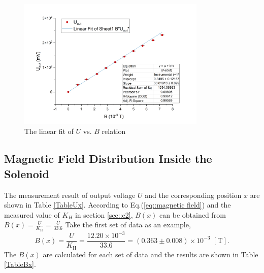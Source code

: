 \documentclass[a4paper]{article}
\begin{document}
\begin{figure}[!htbp]
	\centering
	\includegraphics[width=0.8\textwidth]{linear fit.png}
	\caption{The linear fit of $U$ vs. $B$ relation}
	\label{fig::linear fit}
\end{figure}

\subsection{Magnetic Field Distribution Inside the Solenoid}

The measurement result of output voltage $U$ and the corresponding position $x$ are shown in Table \ref{TableUx}. According to Eq.(\ref{eq::magnetic field}) and the
measured value of $K_{H}$ in section \ref{sec::e2}, $B(x)$ can be obtained from $B(x) = \frac{U}{K_\text{H}} = \frac{U}{33.6}$
Take the first set of data as an example, $$B(x) = \frac{U}{K_\text{H}} = \frac{12.20\times 10^{-3}}{33.6} = (0.363 \pm 0.008) \times 10^{-3} \,\,[\text{T}].$$
The $B(x)$ are calculated for each set of data and the results are shown in Table \ref{TableBx}.
\end{document}
